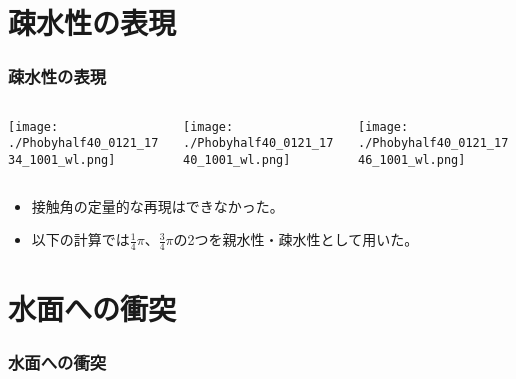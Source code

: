 \documentclass[12pt]{beamer}
\begin{document}
\section{疎水性の表現}
\begin{frame}\frametitle{疎水性の表現}
  \begin{columns}[t]
    \begin{column}{0.3\textwidth}
      \begin{center}
        \texttt{[image: ./Phobyhalf40\_0121\_1734\_1001\_wl.png]}
      \end{center}
    \end{column}

    \begin{column}{0.3\textwidth}
      \begin{center}
        \texttt{[image: ./Phobyhalf40\_0121\_1740\_1001\_wl.png]}
      \end{center}
    \end{column}

    \begin{column}{0.3\textwidth}
      \begin{center}
        \texttt{[image: ./Phobyhalf40\_0121\_1746\_1001\_wl.png]}
      \end{center}
    \end{column}

  \end{columns}
    \begin{itemize}
    \item 接触角の定量的な再現はできなかった。
      \item 以下の計算では$\frac{1}{4}\pi$、$\frac{3}{4}\pi$の2つを親水性・疎水性として用いた。
    \end{itemize}
\end{frame}

\section{水面への衝突}
\begin{frame}\frametitle{水面への衝突}
\end{frame}
\end{document}
